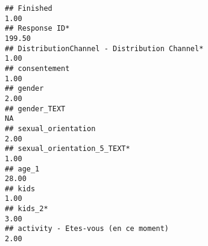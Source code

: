 \documentclass[
]{article}
\begin{document}
\begin{verbatim}
## Finished                                                                                                                                                                                                                     1.00
## Response ID*                                                                                                                                                                                                               199.50
## DistributionChannel - Distribution Channel*                                                                                                                                                                                  1.00
## consentement                                                                                                                                                                                                                 1.00
## gender                                                                                                                                                                                                                       2.00
## gender_TEXT                                                                                                                                                                                                                    NA
## sexual_orientation                                                                                                                                                                                                           2.00
## sexual_orientation_5_TEXT*                                                                                                                                                                                                   1.00
## age_1                                                                                                                                                                                                                       28.00
## kids                                                                                                                                                                                                                         1.00
## kids_2*                                                                                                                                                                                                                      3.00
## activity - Etes-vous (en ce moment)                                                                                                                                                                                          2.00

\end{verbatim}
\end{document}
